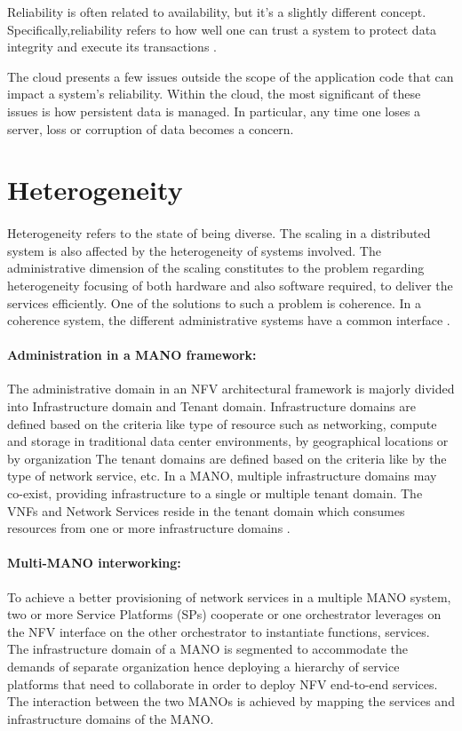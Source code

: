 Reliability is often related to availability, but it’s a slightly different concept. Specifically,reliability refers to how well one can trust a system to protect data integrity and execute its transactions \cite{reese_cloud_nodate}.

The cloud presents a few issues outside the scope of the application code that can impact a system’s reliability. Within the cloud, the most significant of these issues is how persistent data is managed. In particular, any time one loses a server, loss or corruption of data becomes a concern.

\section{Heterogeneity}
\paragraph{}Heterogeneity refers to the state of being diverse. The scaling in a distributed system is also affected by the heterogeneity of systems involved. The administrative dimension of the scaling constitutes to the problem regarding heterogeneity focusing of both hardware and also software required, to deliver the services efficiently. One of the solutions to such a problem is coherence. In a coherence system, the different administrative systems have a common interface \cite{ord1994scale}.



\paragraph{Administration in a MANO framework:}
The administrative domain in an NFV architectural framework is majorly divided into Infrastructure domain and Tenant domain. Infrastructure domains are defined based on the criteria like type of resource such as networking, compute and storage in traditional data center environments, by geographical locations or by organization The tenant domains are defined based on the criteria like by the type of network service, etc. In a MANO, multiple infrastructure domains may co-exist, providing infrastructure to a single or multiple tenant domain. The VNFs and Network Services reside in the tenant domain which consumes resources from one or more infrastructure domains \cite{peinetwork}.

\paragraph{Multi-MANO interworking:}
To achieve a better provisioning of network services in a multiple MANO system, two or more Service Platforms (SPs) cooperate or one orchestrator leverages on the NFV interface on the other orchestrator to instantiate functions, services. The infrastructure domain of a MANO is segmented to accommodate the demands of separate organization hence deploying a hierarchy of service platforms that need to collaborate in order to deploy NFV end-to-end services. The interaction between the two MANOs is achieved by mapping the services and infrastructure domains of the MANO. 

